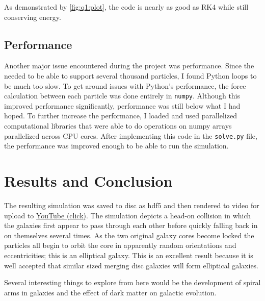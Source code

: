 \documentclass[%
  ,paper=letter
  ,abstract=on
  ,DIV=calc
  ,toc=bib
]{scrartcl}
\begin{document}
As demonstrated by \cref{fig:q1:plot}, the code is nearly as good as RK4 while still conserving energy.

\subsection{Performance}
Another major issue encountered during the project was performance. Since the needed to be able to support several thousand particles, I found Python loops to be much too slow. To get around issues with Python's performance, the force calculation between each particle was done entirely in \texttt{numpy}. Although this improved performance significantly, performance was still below what I had hoped. To further increase the performance, I loaded and used parallelized computational libraries that were able to do operations on numpy arrays parallelized across CPU cores. After implementing this code in the \texttt{solve.py} file, the performance was improved enough to be able to run the simulation.

\section{Results and Conclusion}
The resulting simulation was saved to disc as hdf5 and then rendered to video for upload to \href{https://www.youtube.com/watch?v=Qp0M3gj23YY}{YouTube (click)}. The simulation depicts a head-on collision in which the galaxies first appear to pass through each other before quickly falling back in on themselves several times. As the two original galaxy cores become locked the particles all begin to orbit the core in apparently random orientations and eccentricities; this is an elliptical galaxy. This is an excellent result because it is well accepted that similar sized merging disc galaxies will form elliptical galaxies.

Several interesting things to explore from here would be the development of spiral arms in galaxies and the effect of dark matter on galactic evolution.

\printbibliography
\end{document}
